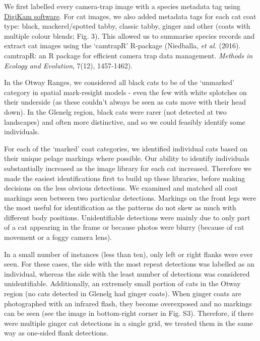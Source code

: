 \documentclass[preprint, 3p, authoryear]{elsarticle} %
\begin{document}
We first labelled every camera-trap image with a species metadata tag using \href{https://www.digikam.org}{DigiKam software}. For cat images, we also added metadata tags for each cat coat type: black, mackerel/spotted tabby, classic tabby, ginger and other (coats with multiple colour blends; Fig. 3). This allowed us to summarise species records and extract cat images using the `camtrapR' R-package (Niedballa, \emph{et al.} (2016). camtrapR: an R package for efficient camera trap data management. \emph{Methods in Ecology and Evolution}, 7(12), 1457-1462).

In the Otway Ranges, we considered all black cats to be of the `unmarked' category in spatial mark-resight models - even the few with white splotches on their underside (as these couldn't always be seen as cats move with their head down). In the Glenelg region, black cats were rarer (not detected at two landscapes) and often more distinctive, and so we could feasibly identify some individuals.

For each of the `marked' coat categories, we identified individual cats based on their unique pelage markings where possible. Our ability to identify individuals substantially increased as the image library for each cat increased. Therefore we made the easiest identifications first to build up these libraries, before making decisions on the less obvious detections. We examined and matched all coat markings seen between two particular detections. Markings on the front legs were the most useful for identification as the patterns do not skew as much with different body positions. Unidentifiable detections were mainly due to only part of a cat appearing in the frame or because photos were blurry (because of cat movement or a foggy camera lens).

In a small number of instances (less than ten), only left or right flanks were ever seen. For these cases, the side with the most repeat detections was labelled as an individual, whereas the side with the least number of detections was considered unidentifiable. Additionally, an extremely small portion of cats in the Otway region (no cats detected in Glenelg had ginger coats). When ginger coats are photographed with an infrared flash, they become overexposed and no markings can be seen (see the image in bottom-right corner in Fig. S3). Therefore, if there were multiple ginger cat detections in a single grid, we treated them in the same way as one-sided flank detections.
\end{document}
